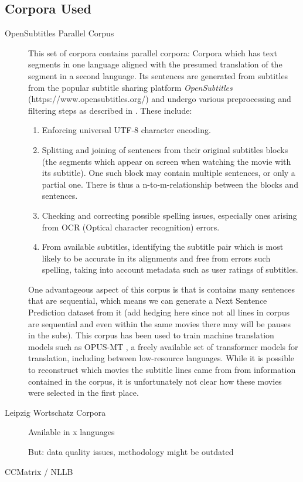 \subsection{Corpora Used}
\begin{description}
	\item[OpenSubtitles Parallel Corpus]
	      This set of corpora contains parallel corpora:
	      Corpora which has text segments in one language aligned with the presumed translation of the segment in a second language.
	      Its sentences are generated from subtitles from the popular subtitle sharing platform \textit{OpenSubtitles} (https://www.opensubtitles.org/) and undergo various preprocessing and filtering steps as described in \cite{lisonOpensubtitles2016ExtractingLarge2016}.
	      These include:
	      \begin{enumerate}
		      \item Enforcing universal UTF-8 character encoding.
		      \item
		            Splitting and joining of sentences from their original subtitles blocks (the segments which appear on screen when watching the movie with its subtitle).
		            One such block may contain multiple sentences, or only a partial one.
		            There is thus a n-to-m-relationship between the blocks and sentences.
		      \item Checking and correcting possible spelling issues, especially ones arising from OCR (Optical character recognition) errors.
		      \item From available subtitles, identifying the subtitle pair which is most likely to be accurate in its alignments and free from errors such spelling, taking into account metadata such as user ratings of subtitles.

	      \end{enumerate}
		  One advantageous aspect of this corpus is that is contains many sentences that are sequential, which means we can generate a Next Sentence Prediction dataset from it (add hedging here since not all lines in corpus are sequential and even within the same movies there may will be pauses in the subs).
		  This corpus has been used to train machine translation models such as OPUS-MT \cite{tiedemannOPUSMTbuildingOpenTranslation2020}, a freely available set of transformer models for translation, including between low-resource languages. 
		  While it is possible to reconstruct which movies the subtitle lines came from from information contained in the corpus, it is unfortunately not clear how these movies were selected in the first place.

	\item[Leipzig Wortschatz Corpora]
		Available in x languages

		But: data quality issues, methodology might be outdated

		\cite{goldhahnBuildingLargeMonolingual2012}
	\item[CCMatrix / NLLB]

\end{description}

